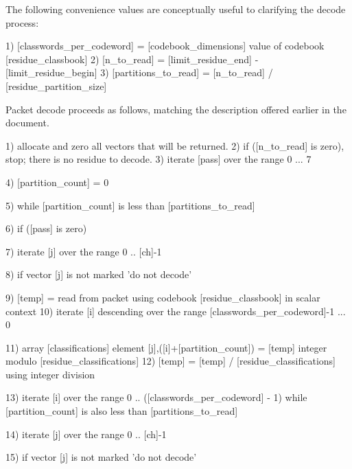 The following convenience values are conceptually useful to clarifying
the decode process:

\begin{programlisting}
  1) [classwords_per_codeword] = [codebook_dimensions] value of codebook [residue_classbook]
  2) [n_to_read] = [limit_residue_end] - [limit_residue_begin]
  3) [partitions_to_read] = [n_to_read] / [residue_partition_size]
\end{programlisting}

Packet decode proceeds as follows, matching the description offered earlier in the document.
\begin{programlisting}
  1) allocate and zero all vectors that will be returned.
  2) if ([n_to_read] is zero), stop; there is no residue to decode.
  3) iterate [pass] over the range 0 ... 7 {

       4) [partition_count] = 0

       5) while [partition_count] is less than [partitions_to_read]

            6) if ([pass] is zero) {

                 7) iterate [j] over the range 0 .. [ch]-1 {

                      8) if vector [j] is not marked 'do not decode' {

                           9) [temp] = read from packet using codebook [residue_classbook] in scalar context
                          10) iterate [i] descending over the range [classwords_per_codeword]-1 ... 0 {

                               11) array [classifications] element [j],([i]+[partition_count]) =
                                   [temp] integer modulo [residue_classifications]
                               12) [temp] = [temp] / [residue_classifications] using integer division

                              }

                         }

                    }

               }

           13) iterate [i] over the range 0 .. ([classwords_per_codeword] - 1) while [partition_count]
               is also less than [partitions_to_read] {

                 14) iterate [j] over the range 0 .. [ch]-1 {

                      15) if vector [j] is not marked 'do not decode' {

}}}}
\end{programlisting}
